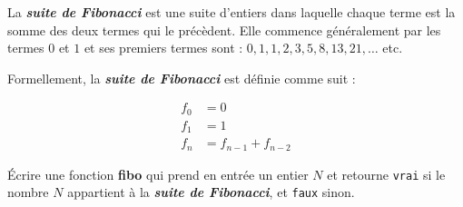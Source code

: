 \documentclass[11pt]{exam}
\begin{document}
\begin{questions}
\newpage
\question La \textit{\bf suite de Fibonacci} est une suite d'entiers dans laquelle chaque terme est la somme des deux termes qui le pr\'ec\`edent. Elle commence g\'en\'eralement par les termes $0$ et $1$ et ses premiers termes sont : $0, 1, 1, 2, 3, 5, 8, 13, 21,\dots$ etc.

Formellement, la \textit{\bf suite de Fibonacci} est d\'efinie comme suit :

\begin{align*}
f_0 &= 0\\
f_1 &= 1\\
f_n &= f_{n-1} + f_{n-2}
\end{align*}

\'Ecrire une fonction \textcolor{ballblue}{\bf fibo} qui prend en entr\'ee un entier $N$ et retourne \texttt{vrai} si le nombre $N$ appartient \`a la \textit{\bf suite de Fibonacci}, et \texttt{faux} sinon.







\end{questions}
\end{document}
